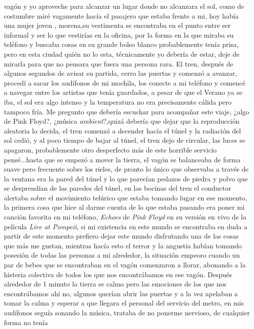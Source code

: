 \documentclass[letterpaper]{article}
\begin{document}
vagón y yo aproveche para alcanzar un lugar donde no alcanzara el sol, como de costumbre miré
vagamente hacía el pasajero que estaba frente a mi, hoy había una mujer joven , morena,su
vestimenta se encontraba en el punto entre ser informal y ser lo que vestirías en la oficina,
por la forma en la que miraba su teléfono y buscaba cosas en su grande bolso blanco probablemente tenía prisa,
pero en esta ciudad quién no lo esta, técnicamente yo debería de estar, deje de mirarla para que no
pensara que fuera una persona rara. El tren, después de algunos segundos de avisar su partida,
cerro las puertas y comenzó a avanzar, procedí a sacar los audífonos de mi mochila, los conecte a mi
teléfono y comencé a navegar entre los artistas que tenía guardados, a pesar de que el Verano ya se
iba, el sol era algo intenso y la temperatura no era precisamente cálida pero tampoco fría. Me
pregunto que debería escuchar para acompañar este viaje, ¿algo de Pink Floyd?, ¿música
\textit{ambient}?,quizá debería que dejar que la reproducción aleatoria lo decida, el tren comenzó a
decender hacía el túnel y la radiación del sol cedió, y al poco tiempo de bajar al túnel, el tren
dejo de circular, las luces se apagaron, probablemente otro desperfecto más de este horrible
servicio pensé...hasta que se empezó a mover la tierra, el vagón se balanceaba de forma suave pero
frecuente sobre los rieles, de pronto lo único que observaba a través de la ventana era la pared del
túnel y lo que parecían pedazos de piedra y polvo que se desprendían de las paredes del túnel, en
las bocinas del tren el conductor alertaba sobre el movimiento telúrico que estaba tomando lugar en
ese momento, la
primera cosa que hice al darme cuenta de lo que estaba pasando era poner mi canción favorita en mi
teléfono, \textit{Echoes} de \textit{Pink Floyd} en su versión en vivo de la película \textit{Live
at Pompeii}, si mi existencia en este mundo se encontraba en duda a partir de este momento prefiero
dejar este mundo disfrutando una de las cosas que más me gustan, mientras hacía esto el terror y la
angustia habían tomando posesión de todas las personas a mi alrededor, la situación empeoro
cuando un par de bebes que se encontraban en el vagón comenzaron a llorar, abonando a la histeria
colectiva de todos los que nos encontrábamos en ese vagón. Después alrededor de 1 minuto la tierra
se calmo pero las emociones de los que nos encontrábamos ahí no, algunos querían abrir las puertas y
a la vez apelaban a tomar la calma y esperar a que llegara el personal del servicio del metro, en
mis audífonos seguía sonando la música, trataba de no ponerme nervioso, de cualquier forma no tenía
\end{document}
